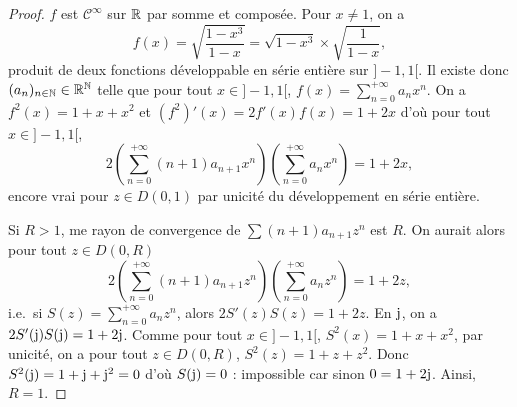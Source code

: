\documentclass[12pt]{article}
\begin{document}
\begin{proof}
    $f$ est $\mathcal{C}^{\infty}$ sur $\mathbb{R}$ par somme et composée. Pour $x\neq1$, on a 
    \begin{equation}
        f(x)=\sqrt{\frac{1-x^{3}}{1-x}}=\sqrt{1-x^{3}}\times\sqrt{\frac{1}{1-x}},
    \end{equation}
    produit de deux fonctions développable en série entière sur $]-1,1[$. Il existe donc $(a_n)_{n\in\mathbb{N}}\in\mathbb{R}^{\mathbb{N}}$ telle que pour tout $x\in]-1,1[$, $f(x)=\sum_{n=0}^{+\infty}a_nx^{n}$. On a $f^{2}(x)=1+x+x^{2}$ et $(f^{2})'(x)=2f'(x)f(x)=1+2x$ d'où pour tout $x\in]-1,1[$,
    \begin{equation}
        2\left(\sum_{n=0}^{+\infty}(n+1)a_{n+1}x^{n}\right)\left(\sum_{n=0}^{+\infty}a_nx^{n}\right)=1+2x,
    \end{equation}
    encore vrai pour $z\in D(0,1)$ par unicité du développement en série entière.

    Si $R>1$, me rayon de convergence de $\sum(n+1)a_{n+1}z^{n}$ est $R$. On aurait alors pour tout $z\in D(0,R)$
    \begin{equation}
        2\left(\sum_{n=0}^{+\infty}(n+1)a_{n+1}z^{n}\right)\left(\sum_{n=0}^{+\infty}a_nz^{n}\right)=1+2z,
    \end{equation}
    i.e.~si $S(z)=\sum_{n=0}^{+\infty}a_nz^{n}$, alors $2S'(z)S(z)=1+2z$. En $\mathrm{j}$, on a $2S'(\mathrm{j})S(\mathrm{j})=1+2\mathrm{j}$. Comme pour tout $x\in]-1,1[$, $S^{2}(x)=1+x+x^{2}$, par unicité, on a pour tout $z\in D(0,R)$, $S^{2}(z)=1+z+z^{2}$. Donc $S^{2}(\mathrm{j})=1+\mathrm{j}+\mathrm{j}^{2}=0$ d'où $S(\mathrm{j})=0$ : impossible car sinon $0=1+2\mathrm{j}$. Ainsi, $R=1$.
\end{proof}
\end{document}

